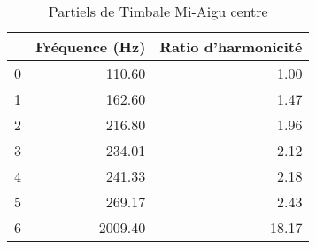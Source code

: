 \begin{table}
\centering
\caption{Partiels de Timbale Mi-Aigu centre}
\label{table:partiels-timbale-miaigu-4.wav}
\begin{tabular}{lrr}
\toprule
{} &  Fréquence (Hz) &  Ratio d'harmonicité \\
\midrule
0 &          110.60 &                 1.00 \\
1 &          162.60 &                 1.47 \\
2 &          216.80 &                 1.96 \\
3 &          234.01 &                 2.12 \\
4 &          241.33 &                 2.18 \\
5 &          269.17 &                 2.43 \\
6 &         2009.40 &                18.17 \\
\bottomrule
\end{tabular}
\end{table}
